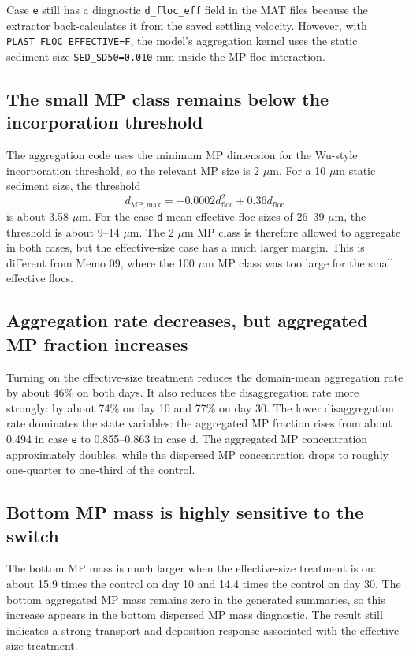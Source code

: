 \documentclass[11pt]{article}
\begin{document}
Case \texttt{e} still has a diagnostic \texttt{d\_floc\_eff} field in the MAT
files because the extractor back-calculates it from the saved settling
velocity.  However, with \texttt{PLAST\_FLOC\_EFFECTIVE=F}, the model's
aggregation kernel uses the static sediment size \texttt{SED\_SD50=0.010} mm
inside the MP-floc interaction.

\subsection*{The small MP class remains below the incorporation threshold}

The aggregation code uses the minimum MP dimension for the Wu-style
incorporation threshold, so the relevant MP size is 2 $\mu$m.  For a 10 $\mu$m
static sediment size, the threshold
\[
  d_{\mathrm{MP,max}} =
  -0.0002 d_{\mathrm{floc}}^2 + 0.36 d_{\mathrm{floc}}
\]
is about 3.58 $\mu$m.  For the case-\texttt{d} mean effective floc sizes of
26--39 $\mu$m, the threshold is about 9--14 $\mu$m.  The 2 $\mu$m MP class is
therefore allowed to aggregate in both cases, but the effective-size case has a
much larger margin.  This is different from Memo 09, where the 100 $\mu$m MP
class was too large for the small effective flocs.

\subsection*{Aggregation rate decreases, but aggregated MP fraction increases}

Turning on the effective-size treatment reduces the domain-mean aggregation
rate by about 46\% on both days.  It also reduces the disaggregation rate more
strongly: by about 74\% on day 10 and 77\% on day 30.  The lower
disaggregation rate dominates the state variables: the aggregated MP fraction
rises from about 0.494 in case \texttt{e} to 0.855--0.863 in case
\texttt{d}.  The aggregated MP concentration approximately doubles, while the
dispersed MP concentration drops to roughly one-quarter to one-third of the
control.

\subsection*{Bottom MP mass is highly sensitive to the switch}

The bottom MP mass is much larger when the effective-size treatment is on:
about 15.9 times the control on day 10 and 14.4 times the control on day 30.
The bottom aggregated MP mass remains zero in the generated summaries, so this
increase appears in the bottom dispersed MP mass diagnostic.  The result still
indicates a strong transport and deposition response associated with the
effective-size treatment.
\end{document}

